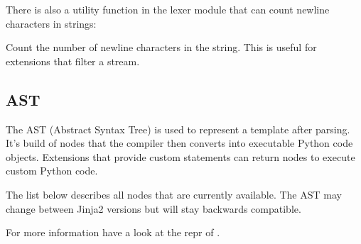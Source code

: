\documentclass[a4paper,10pt,english]{sphinxmanual}
\begin{document}
There is also a utility function in the lexer module that can count newline
characters in strings:

\begin{fulllineitems}
\label{extensions:jinja2.lexer.count_newlines}
Count the number of newline characters in the string.  This is
useful for extensions that filter a stream.

\end{fulllineitems}



\subsection{AST}
\label{extensions:ast}
The AST (Abstract Syntax Tree) is used to represent a template after parsing.
It's build of nodes that the compiler then converts into executable Python
code objects.  Extensions that provide custom statements can return nodes to
execute custom Python code.

The list below describes all nodes that are currently available.  The AST may
change between Jinja2 versions but will stay backwards compatible.

For more information have a look at the repr of {\hyperref[api:jinja2.Environment.parse]{}}.
\label{extensions:module-jinja2.nodes}
\end{document}
